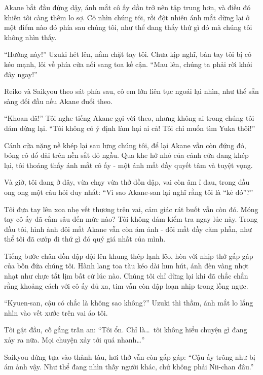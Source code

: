 \documentclass[../main.tex]{subfiles}
\begin{document}
Akane bắt đầu đứng dậy, ánh mắt cô ấy dần trở nên tập trung hơn, và điều đó khiến tôi càng thêm lo sợ. Cô nhìn chúng tôi, rồi đột nhiên ánh mắt dừng lại ở một điểm nào đó phía sau chúng tôi, như thể đang thấy thứ gì đó mà chúng tôi không nhìn thấy.

``Hướng này!'' Uzuki hét lên, nắm chặt tay tôi. Chưa kịp nghĩ, bàn tay tôi bị cô kéo mạnh, lôi về phía cửa nối sang toa kế cận. ``Mau lên, chúng ta phải rời khỏi đây ngay!''


Reiko và Saikyou theo sát phía sau, cô em lớn liên tục ngoái lại nhìn, như thể sẵn sàng đối đầu nếu Akane đuổi theo.

``Khoan đã!'' Tôi nghe tiếng Akane gọi với theo, nhưng không ai trong chúng tôi dám dừng lại. ``Tôi không có ý định làm hại ai cả! Tôi chỉ muốn tìm Yuka thôi!''

Cánh cửa nặng nề khép lại sau lưng chúng tôi, để lại Akane vẫn còn đứng đó, bóng cô đổ dài trên nền sắt đỏ ngầu. Qua khe hở nhỏ của cánh cửa đang khép lại, tôi thoáng thấy ánh mắt cô ấy - một ánh mắt đầy quyết tâm và tuyệt vọng.

\ct

Và giờ, tôi đang ở đây, vừa chạy vừa thở dồn dập, vai còn âm ỉ đau, trong đầu ong ong một câu hỏi duy nhất: ``Vì sao Akane-san lại nghĩ rằng tôi là ``kẻ đó''?''

Tôi đưa tay lên xoa nhẹ vết thương trên vai, cảm giác rát buốt vẫn còn đó. Móng tay cô ấy đã cắm sâu đến mức nào? Tôi không dám kiểm tra ngay lúc này. Trong đầu tôi, hình ảnh đôi mắt Akane vẫn còn ám ảnh - đôi mắt đầy căm phẫn, như thể tôi đã cướp đi thứ gì đó quý giá nhất của mình.

Tiếng bước chân dồn dập dội lên khung thép lạnh lẽo, hòa với nhịp thở gấp gáp của bốn đứa chúng tôi. Hành lang toa tàu kéo dài hun hút, ánh đèn vàng nhợt nhạt như chực tắt lịm bất cứ lúc nào. Chúng tôi chỉ dừng lại khi đã chắc chắn rằng khoảng cách với cô ấy đủ xa, tim vẫn còn đập loạn nhịp trong lồng ngực.


``Kyuen-san, cậu có chắc là không sao không?'' Uzuki thì thầm, ánh mắt lo lắng nhìn vào vết xước trên vai áo tôi.

Tôi gật đầu, cố gắng trấn an: ``Tôi ổn. Chỉ là\dots\ tôi không hiểu chuyện gì đang xảy ra nữa. Mọi chuyện xảy tới quá nhanh\dots''

Saikyou đứng tựa vào thành tàu, hơi thở vẫn còn gấp gáp: ``Cậu ấy trông như bị ám ảnh vậy. Như thể đang nhìn thấy người khác, chứ không phải Nii-chan đâu.''
\end{document}
